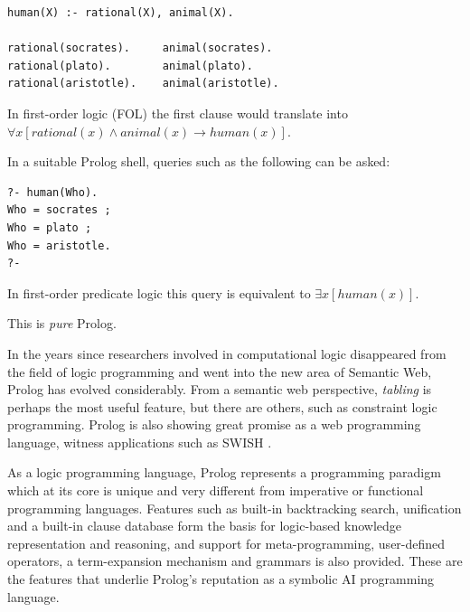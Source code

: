 \documentclass{tlp}
\begin{document}
\begin{lstlisting}
human(X) :- rational(X), animal(X).

rational(socrates).     animal(socrates).
rational(plato).        animal(plato).
rational(aristotle).    animal(aristotle).
\end{lstlisting}

\noindent In first-order logic (FOL) the first clause would translate into $\forall x [rational(x) \land animal(x) \rightarrow human(x)]$.

In a suitable Prolog shell, queries such as the following can be asked:

\begin{lstlisting}
?- human(Who).
Who = socrates ;
Who = plato ;
Who = aristotle.
?-
\end{lstlisting}

\noindent In first-order predicate logic this query is equivalent to $\exists x [human(x)]$.

This is \textit{pure} Prolog.

In the years since researchers involved in computational logic disappeared from the field of logic programming and went into the new area of Semantic Web, Prolog has evolved considerably. From a semantic web perspective, \textit{tabling} \cite{??} is perhaps the most useful feature, but there are others, such as constraint logic programming. Prolog is also showing great promise as a web programming language, witness applications such as SWISH \cite{DBLP:journals/corr/abs-1808-08042}. 

As a logic programming language, Prolog represents a programming paradigm which at its core is unique and very different from imperative or functional programming languages. Features such as built-in backtracking search, unification and a built-in clause database form the basis for logic-based knowledge representation and reasoning, and support for meta-programming, user-defined operators, a term-expansion mechanism and grammars is also provided. These are the features that underlie Prolog's reputation as a symbolic AI programming language. 


%
%
%
\end{document}
